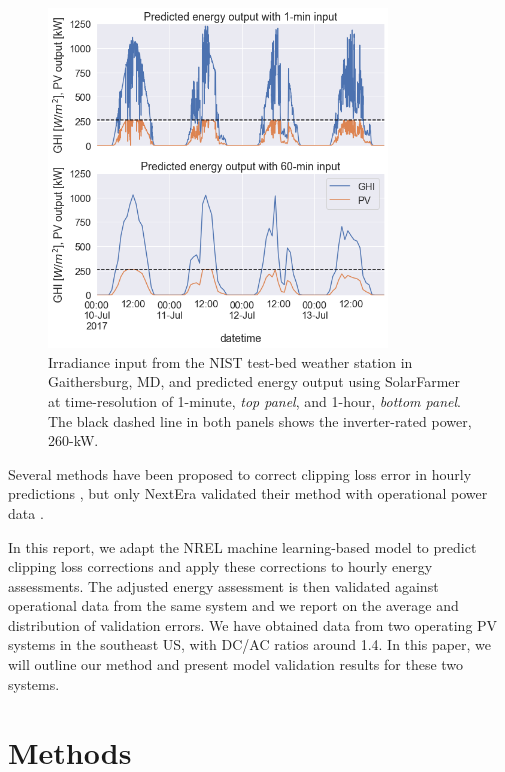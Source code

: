 \documentclass[conference]{IEEEtran}
\begin{document}
\begin{figure}[htbp]
\centerline{\includegraphics[width=9cm]{hourly_v_1-min_clipping.png}}
\caption{Irradiance input from the NIST test-bed weather station in Gaithersburg, MD, and predicted energy output using SolarFarmer at time-resolution of 1-minute, \textit{top panel}, and 1-hour, \textit{bottom panel}. The black dashed line in both panels shows the inverter-rated power, 260-kW.}
\label{fig:irradiance-and-power}
\end{figure}


Several methods have been proposed to correct clipping loss error in hourly predictions \cite{Cormode2019,Kharait,Anderson2020,Bradford,Allen2019,hofmann2014improved}, but only NextEra validated their method with operational power data \cite{Bradford}. 

In this report, we adapt the NREL machine learning-based model \cite{Anderson2020} to predict clipping loss corrections and apply these corrections to hourly energy assessments. The adjusted energy assessment is then validated against operational data from the same system and we report on the average and distribution of validation errors.  We have obtained data from two operating PV systems in the southeast US, with DC/AC ratios around 1.4. In this paper, we will outline our method and present model validation results for these two systems. 

\section{Methods}
\end{document}
